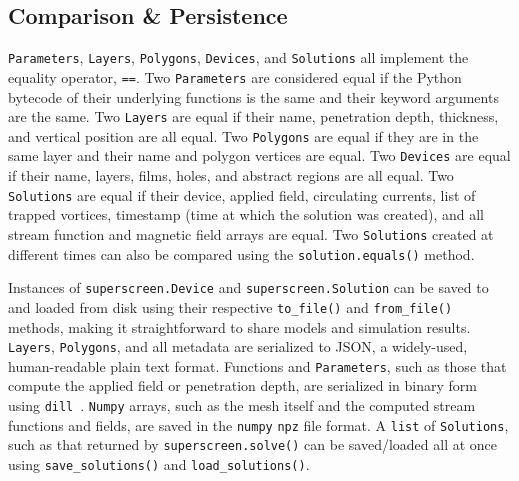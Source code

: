 \documentclass[final,3p,times]{elsarticle}
\newcommand{\inline}[1]{\texttt{#1}\xspace}
\begin{document}

\subsection{Comparison \& Persistence}
\label{section:overview:persistence}

\inline{Parameters}, \inline{Layers}, \inline{Polygons}, \inline{Devices}, and \inline{Solutions} all implement the equality operator, \inline{==}. Two \inline{Parameters} are considered equal if the Python bytecode of their underlying functions is the same and their keyword arguments are the same. Two \inline{Layers} are equal if their name, penetration depth, thickness, and vertical position are all equal. Two \inline{Polygons} are equal if they are in the same layer and their name and polygon vertices are equal. Two \inline{Devices} are equal if their name, layers, films, holes, and abstract regions are all equal. Two \inline{Solutions} are equal if their device, applied field, circulating currents, list of trapped vortices, timestamp (time at which the solution was created), and all stream function and magnetic field arrays are equal. Two \inline{Solutions} created at different times can also be compared using the  \inline{solution.equals()} method.

Instances of \inline{superscreen.Device} and \inline{superscreen.Solution} can be saved to and loaded from disk using their respective \inline{to_file()} and \inline{from_file()} methods, making it straightforward to share models and simulation results. \inline{Layers}, \inline{Polygons}, and all metadata are serialized to JSON, a widely-used, human-readable plain text format. Functions and \inline{Parameters}, such as those that compute the applied field or penetration depth, are serialized in binary form using \inline{dill}~\cite{McKerns}. \inline{Numpy} arrays, such as the mesh itself and the computed stream functions and fields, are saved in the \inline{numpy} \inline{npz} file format. A \inline{list} of \inline{Solutions}, such as that returned by \inline{superscreen.solve()} can be saved/loaded all at once using \inline{save_solutions()} and \inline{load_solutions()}.
\end{document}
